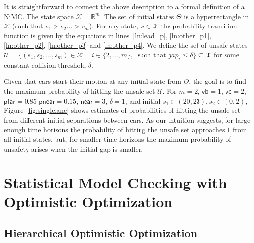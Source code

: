 \documentclass[11pt]{article}
\theoremstyle{definition}
\newcommand{\sayan}[1]{\textcolor{blue}{#1}}
\newcommand{\geir}[1]{\textcolor{red}{#1}}
\newcommand{\X}{\mathcal{X}}
\newcommand{\Unsafe}{\mathcal{U}}
\newcommand{\modelname}{NiMC\xspace}
\begin{document}
It is straightforward to connect the above  description to a formal definition of a \modelname. The state space  $\X=\mathbb{R}^m$. The set of initial states $\Theta$ is a hyperrectangle in  $\X$ (such that $s_1 > s_2 \ldots > s_m$). For any state, $x\in \X$ the probability transition function is given by the equations in lines~\ref{ln:lead_p}, \ref{ln:other_p1}, \ref{ln:other_p2}, \ref{ln:other_p3} and \ref{ln:other_p4}.
We define the set of unsafe states $\Unsafe =\{(s_{1},s_{2},...,s_{m})\in \X\ |\ \exists i\in\{2,...,m\},\ \mbox{ such that }\mathit{gap}_i  \leq \delta\}\subseteq \X$ for some constant collision threshold $\delta$.

Given that cars start their motion at any initial state from $\Theta$, the goal is to find the maximum probability of hitting the unsafe set $\Unsafe$.
For $m=2$,
$\mathsf{vb} = 1$,
$\mathsf{vc} = 2$,
$\mathsf{pfar} = 0.85$
$\mathsf{pnear} = 0.15$,
$\mathsf{near} = 3$,
$\delta = 1$,
and initial $s_1 \in  (20,23), s_2 \in  (0,2)$,
Figure~\ref{fig:singlelane} shows estimates of probabilities of hitting the unsafe set from different initial separations between cars.
%
As our intuition suggests, for large enough time horizons the probability of hitting the unsafe set approaches $1$ from all initial states, but, for smaller time horizons the maximum probability of unsafety arises when the initial gap is smaller.


\section{Statistical Model Checking with Optimistic Optimization}
%
\subsection{Hierarchical Optimistic Optimization}
\label{sec:multi-fid-background}
\end{document}
